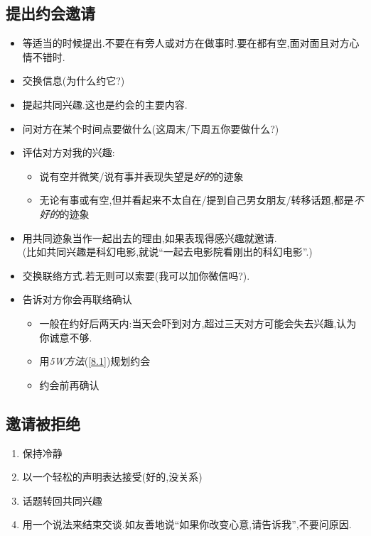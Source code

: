 \documentclass[UTF8]{article}
\begin{document}
\subsection{提出约会邀请\label{10.2}}
\begin{itemize}
    \item 等适当的时候提出.不要在有旁人或对方在做事时.要在都有空,面对面且对方心情不错时.
    \item 交换信息(为什么约它?)
    \item 提起共同兴趣.这也是约会的主要内容.
    \item 问对方在某个时间点要做什么(这周末/下周五你要做什么?)
    \item 评估对方对我的兴趣:\begin{itemize}[label=*]
        \item 说有空并微笑/说有事并表现失望是\emph{好的}的迹象
        \item 无论有事或有空,但并看起来不太自在/提到自己男女朋友/转移话题,都是\emph{不好的}的迹象
    \end{itemize}
    \item 用共同迹象当作一起出去的理由,如果表现得感兴趣就邀请.\\ (比如共同兴趣是科幻电影,就说``一起去电影院看刚出的科幻电影''.)
    \item 交换联络方式.若无则可以索要(我可以加你微信吗?).
    \item 告诉对方你会再联络确认\begin{itemize}
        \item 一般在约好后两天内:当天会吓到对方,超过三天对方可能会失去兴趣,认为你诚意不够.
        \item 用\emph{5W方法}(\ref{8.1})规划约会
        \item 约会前再确认
    \end{itemize}
\end{itemize}

\subsection{邀请被拒绝}
\begin{enumerate}
    \item 保持冷静
    \item 以一个轻松的声明表达接受(好的,没关系)
    \item 话题转回共同兴趣
    \item 用一个说法来结束交谈.如友善地说``如果你改变心意,请告诉我'',不要问原因.
\end{enumerate}
\end{document}
